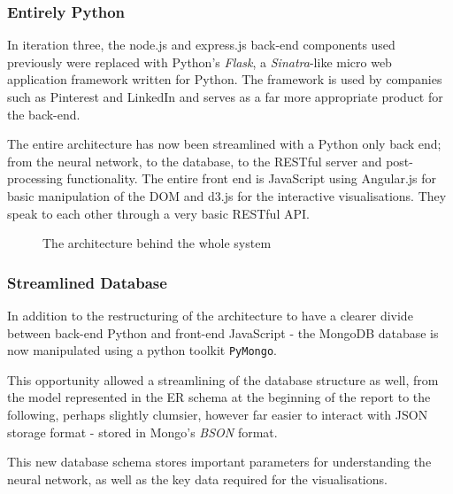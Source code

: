 \documentclass[a4paper,11pt,titlepage]{article}
\begin{document}
		\subsubsection{Entirely Python} 
	In iteration three, the node.js and express.js back-end components used previously were replaced with Python's \textit{Flask}, a \textit{Sinatra}-like micro web application framework written for Python.  The framework is used by companies such as Pinterest and LinkedIn and serves as a far more appropriate product for the back-end.
	\par 
	The entire architecture has now been streamlined with a Python only back end; from the neural network, to the database, to the RESTful server and post-processing functionality. The entire front end is JavaScript using Angular.js for basic manipulation of the DOM and d3.js for the interactive visualisations. They speak to each other through a very basic RESTful API.
	\begin{figure}[H]
    			\caption{The architecture behind the whole system}%
	\end{figure}	
	
	\subsubsection{Streamlined Database}
	In addition to the restructuring of the architecture to have a clearer divide between back-end Python and front-end JavaScript - the MongoDB database is now manipulated using a python toolkit \texttt{PyMongo}. 
	\par 
	This opportunity allowed a streamlining of the database structure as well, from the model represented in the ER schema at the beginning of the report to the following, perhaps slightly clumsier, however far easier to interact with JSON storage format - stored in Mongo's \textit{BSON} format.
	\par 
	This new database schema stores important parameters for understanding the neural network, as well as the key data required for the visualisations.
	
\end{document}
